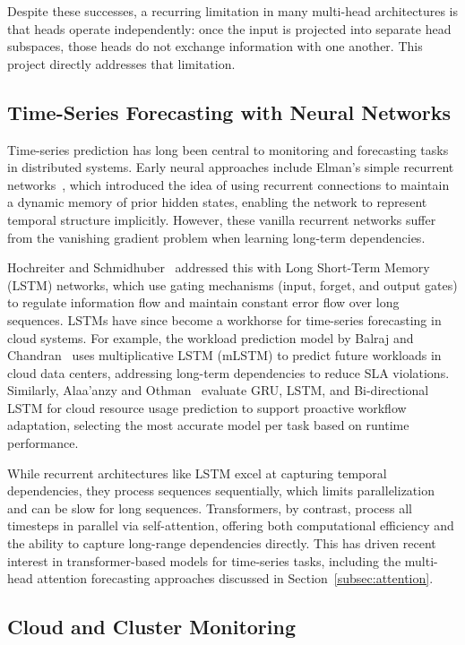 Despite these successes, a recurring limitation in many multi-head architectures is that heads operate independently: once the input is projected into separate head subspaces, those heads do not exchange information with one another. This project directly addresses that limitation.

\subsection{Time-Series Forecasting with Neural Networks}
\label{subsec:timeseries}

Time-series prediction has long been central to monitoring and forecasting tasks in distributed systems. Early neural approaches include Elman's simple recurrent networks~\cite{Elman90}, which introduced the idea of using recurrent connections to maintain a dynamic memory of prior hidden states, enabling the network to represent temporal structure implicitly. However, these vanilla recurrent networks suffer from the vanishing gradient problem when learning long-term dependencies.

Hochreiter and Schmidhuber~\cite{Hochreiter97} addressed this with Long Short-Term Memory (LSTM) networks, which use gating mechanisms (input, forget, and output gates) to regulate information flow and maintain constant error flow over long sequences. LSTMs have since become a workhorse for time-series forecasting in cloud systems. For example, the workload prediction model by Balraj and Chandran~\cite{WorkloadmLSTM24} uses multiplicative LSTM (mLSTM) to predict future workloads in cloud data centers, addressing long-term dependencies to reduce SLA violations. Similarly, Alaa'anzy and Othman~\cite{MultiModelDL19} evaluate GRU, LSTM, and Bi-directional LSTM for cloud resource usage prediction to support proactive workflow adaptation, selecting the most accurate model per task based on runtime performance.

While recurrent architectures like LSTM excel at capturing temporal dependencies, they process sequences sequentially, which limits parallelization and can be slow for long sequences. Transformers, by contrast, process all timesteps in parallel via self-attention, offering both computational efficiency and the ability to capture long-range dependencies directly. This has driven recent interest in transformer-based models for time-series tasks, including the multi-head attention forecasting approaches discussed in Section~\ref{subsec:attention}.

\subsection{Cloud and Cluster Monitoring}
\label{subsec:monitoring}

